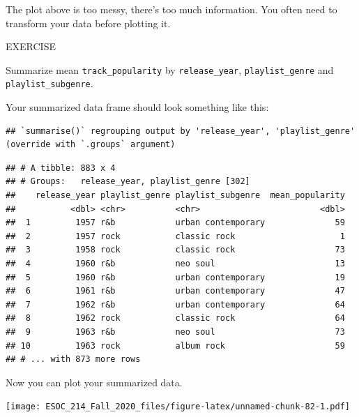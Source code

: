 \documentclass[
]{book}
\newenvironment{Shaded}{\begin{snugshade}}{\end{snugshade}}
\newcommand{\DataTypeTok}[1]{\textcolor[rgb]{0.13,0.29,0.53}{#1}}
\newcommand{\KeywordTok}[1]{\textcolor[rgb]{0.13,0.29,0.53}{\textbf{#1}}}
\newcommand{\NormalTok}[1]{#1}
\newcommand{\OperatorTok}[1]{\textcolor[rgb]{0.81,0.36,0.00}{\textbf{#1}}}
\newcommand{\StringTok}[1]{\textcolor[rgb]{0.31,0.60,0.02}{#1}}
\begin{document}
The plot above is too messy, there's too much information. You often need to transform your data before plotting it.

EXERCISE

Summarize mean \texttt{track\_popularity} by \texttt{release\_year}, \texttt{playlist\_genre} and \texttt{playlist\_subgenre}.

Your summarized data frame should look something like this:

\begin{verbatim}
## `summarise()` regrouping output by 'release_year', 'playlist_genre' (override with `.groups` argument)
\end{verbatim}

\begin{verbatim}
## # A tibble: 883 x 4
## # Groups:   release_year, playlist_genre [302]
##    release_year playlist_genre playlist_subgenre  mean_popularity
##           <dbl> <chr>          <chr>                        <dbl>
##  1         1957 r&b            urban contemporary              59
##  2         1957 rock           classic rock                     1
##  3         1958 rock           classic rock                    73
##  4         1960 r&b            neo soul                        13
##  5         1960 r&b            urban contemporary              19
##  6         1961 r&b            urban contemporary              47
##  7         1962 r&b            urban contemporary              64
##  8         1962 rock           classic rock                    64
##  9         1963 r&b            neo soul                        73
## 10         1963 rock           album rock                      59
## # ... with 873 more rows
\end{verbatim}

Now you can plot your summarized data.

\begin{Shaded}
\end{Shaded}

\texttt{[image: ESOC\_214\_Fall\_2020\_files/figure-latex/unnamed-chunk-82-1.pdf]}
\end{document}
